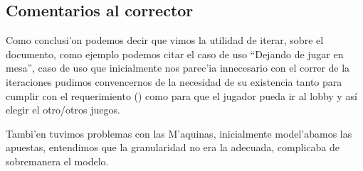 \subsection{Comentarios al corrector}

Como conclusi'on podemos decir que vimos la utilidad de 
iterar, sobre el documento, como ejemplo podemos citar
el caso de uso ``Dejando de jugar en mesa'', caso de uso 
que inicialmente nos parec'ia innecesario con el correr
de la iteraciones pudimos convencernos de la necesidad de su existencia
tanto para cumplir con el requerimiento () como para 
que el jugador pueda ir al lobby y así elegir el otro/otros juegos.

Tambi'en tuvimos problemas con las M'aquinas, inicialmente model'abamos las
apuestas, entendimos que la granularidad no era la adecuada, 
complicaba de sobremanera el modelo.








% 
% 
% 

